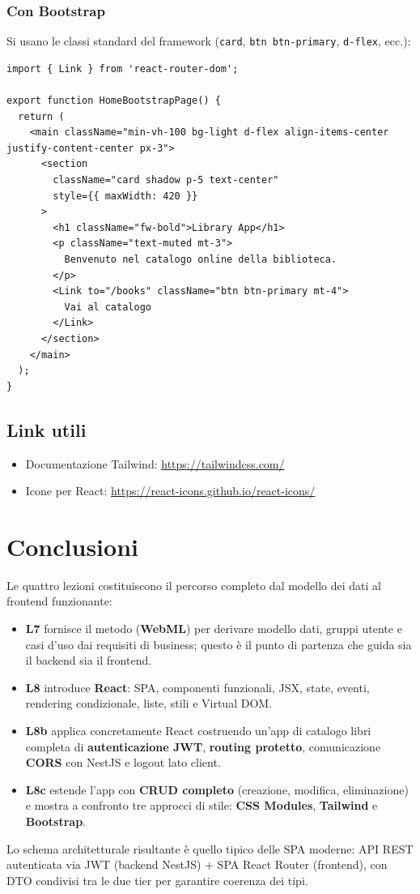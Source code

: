 \documentclass[11pt,a4paper]{article}
\begin{document}
\subsubsection{Con Bootstrap}
Si usano le classi standard del framework (\texttt{card}, \texttt{btn btn-primary}, \texttt{d-flex}, ecc.):

\begin{lstlisting}[language=tsx]
import { Link } from 'react-router-dom';

export function HomeBootstrapPage() {
  return (
    <main className="min-vh-100 bg-light d-flex align-items-center justify-content-center px-3">
      <section
        className="card shadow p-5 text-center"
        style={{ maxWidth: 420 }}
      >
        <h1 className="fw-bold">Library App</h1>
        <p className="text-muted mt-3">
          Benvenuto nel catalogo online della biblioteca.
        </p>
        <Link to="/books" className="btn btn-primary mt-4">
          Vai al catalogo
        </Link>
      </section>
    </main>
  );
}
\end{lstlisting}

\subsection{Link utili}
\begin{itemize}[leftmargin=*]
    \item Documentazione Tailwind: \url{https://tailwindcss.com/}
    \item Icone per React: \url{https://react-icons.github.io/react-icons/}
\end{itemize}

\section*{Conclusioni}

Le quattro lezioni costituiscono il percorso completo dal modello dei dati al frontend funzionante:

\begin{itemize}[leftmargin=*]
    \item \textbf{L7} fornisce il metodo (\textbf{WebML}) per derivare modello dati, gruppi utente e casi d'uso dai requisiti di business; questo \`e il punto di partenza che guida sia il backend sia il frontend.
    \item \textbf{L8} introduce \textbf{React}: SPA, componenti funzionali, JSX, state, eventi, rendering condizionale, liste, stili e Virtual DOM.
    \item \textbf{L8b} applica concretamente React costruendo un'app di catalogo libri completa di \textbf{autenticazione JWT}, \textbf{routing protetto}, comunicazione \textbf{CORS} con NestJS e logout lato client.
    \item \textbf{L8c} estende l'app con \textbf{CRUD completo} (creazione, modifica, eliminazione) e mostra a confronto tre approcci di stile: \textbf{CSS Modules}, \textbf{Tailwind} e \textbf{Bootstrap}.
\end{itemize}

Lo schema architetturale risultante \`e quello tipico delle SPA moderne: API REST autenticata via JWT (backend NestJS) + SPA React Router (frontend), con DTO condivisi tra le due tier per garantire coerenza dei tipi.
\end{document}
